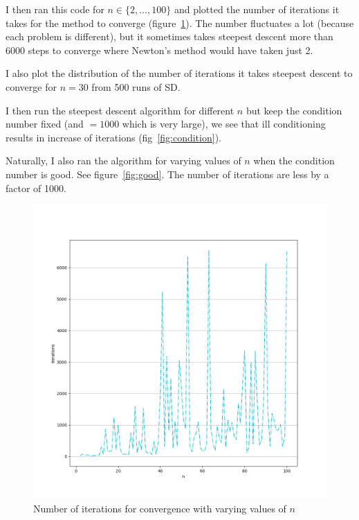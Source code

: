 \documentclass[11pt]{article}
\begin{document}
I then ran this code for $n\in\{2,\dotsc,100\}$ and plotted the number of iterations
it takes for the method to converge (figure~\ref{fig:niter}). The number fluctuates
a lot (because each problem is different), but it sometimes takes steepest descent
more than 6000 steps to converge where Newton's method would have taken just 2.\par
I also plot the distribution of the number of iterations it takes steepest descent
to converge for $n=30$ from 500 runs of SD.\par
I then run the steepest descent algorithm for different $n$ but keep the condition
number fixed (and $=1000$ which is very large), we see that ill conditioning results
in increase of iterations (fig~\ref{fig:condition}).\par
Naturally, I also ran the algorithm for varying values of $n$ when the condition
number is good. See figure~\ref{fig:good}. The number of iterations are less by
a factor of 1000.
\begin{figure}[!htbp]
    \includegraphics[width=\textwidth]{./niter.png}
    \caption{Number of iterations for convergence with varying values of $n$\label{fig:niter}}
\end{figure}
\end{document}
